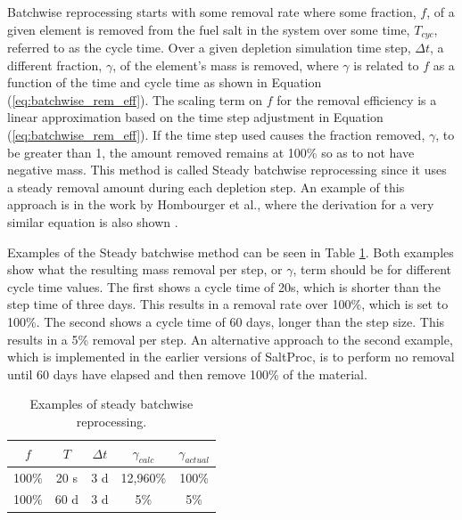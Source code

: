 Batchwise reprocessing starts with some removal rate where some fraction, $f$, of a given element is removed from the fuel salt in the system over some time, $T_{cyc}$, referred to as the cycle time. Over a given depletion simulation time step, $\Delta t$, a different fraction, $\gamma$, of the element's mass is removed, where $\gamma$ is related to $f$ as a function of the time and cycle time as shown in Equation (\ref{eq:batchwise_rem_eff}). The scaling term on $f$ for the removal efficiency is a linear approximation based on the time step adjustment in Equation (\ref{eq:batchwise_rem_eff}). If the time step used causes the fraction removed, $\gamma$, to be greater than 1, the amount removed remains at 100\% so as to not have negative mass. This method is called Steady batchwise reprocessing since it uses a steady removal amount during each depletion step. An example of this approach is in the work by Hombourger et al., where the derivation for a very similar equation is also shown \cite{hombourger_eql0d_2020}.

Examples of the Steady batchwise method can be seen in Table \ref{tab:example_steady_batchwise}. Both examples show what the resulting mass removal per step, or $\gamma$, term should be for different cycle time values. The first shows a cycle time of 20s, which is shorter than the step time of three days. This results in a removal rate over 100\%, which is set to 100\%. The second shows a cycle time of 60 days, longer than the step size. This results in a 5\% removal per step. An alternative approach to the second example, which is implemented in the earlier versions of SaltProc, is to perform no removal until 60 days have elapsed and then remove 100\% of the material.

\begin{table}[H]
    \centering
    \begin{tabular}{c|c|c|c|c}
    $f$ & $T$ & $\Delta t$ & $\gamma_{calc}$ & $\gamma_{actual}$\\
    \hline
    \hline
    100\% & 20 s & 3 d & 12,960\% & 100\%\\
    100\% & 60 d & 3 d & 5\% & 5\%\\
    \end{tabular}
    \caption{Examples of steady batchwise reprocessing.}
    \label{tab:example_steady_batchwise}
\end{table}

